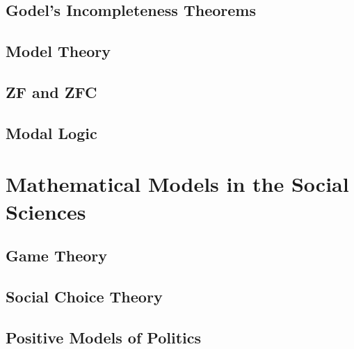 \documentclass[oneside,openany]{book}
\theoremstyle{definition}
\begin{document}
\chapter{Godel's Incompleteness Theorems}


\chapter{Model Theory}


\chapter{ZF and ZFC}


\chapter{Modal Logic}



\part{Mathematical Models in the Social Sciences}

\chapter{Game Theory}


\chapter{Social Choice Theory}


\chapter{Positive Models of Politics}


\printindex
\end{document}
